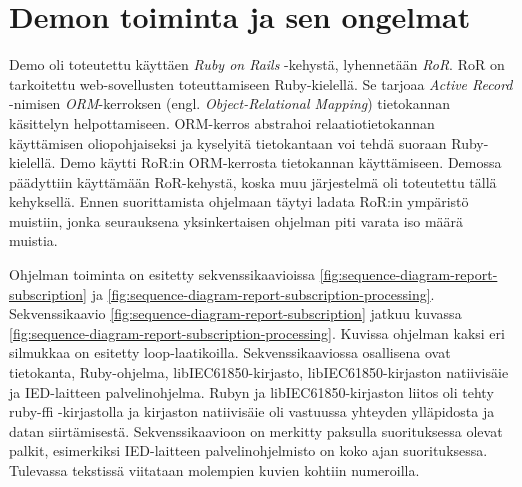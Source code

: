 \section{Demon toiminta ja sen ongelmat}
\label{ch:ongelmakohdat-ja-analysointi}
Demo oli toteutettu käyttäen \emph{Ruby on Rails} -kehystä, lyhennetään \emph{RoR}. RoR on tarkoitettu web-sovellusten toteuttamiseen Ruby-kielellä. Se tarjoaa \emph{Active Record} -nimisen \emph{ORM}-kerroksen (engl. \emph{Object-Relational Mapping}) tietokannan käsittelyn helpottamiseen. ORM-kerros abstrahoi relaatiotietokannan käyttämisen oliopohjaiseksi ja kyselyitä tietokantaan voi tehdä suoraan Ruby-kielellä. Demo käytti RoR:in ORM-kerrosta tietokannan käyttämiseen. Demossa päädyttiin käyttämään RoR-kehystä, koska muu järjestelmä oli toteutettu tällä kehyksellä. Ennen suorittamista ohjelmaan täytyi ladata RoR:in ympäristö muistiin, jonka seurauksena yksinkertaisen ohjelman piti varata iso määrä muistia.

Ohjelman toiminta on esitetty sekvenssikaavioissa \ref{fig:sequence-diagram-report-subscription} ja \ref{fig:sequence-diagram-report-subscription-processing}. Sekvenssikaavio \ref{fig:sequence-diagram-report-subscription} jatkuu kuvassa \ref{fig:sequence-diagram-report-subscription-processing}. Kuvissa ohjelman kaksi eri silmukkaa on esitetty loop-laatikoilla. Sekvenssikaaviossa osallisena ovat tietokanta, Ruby-ohjelma, libIEC61850-kirjasto, libIEC61850-kirjaston natiivisäie ja IED-laitteen palvelinohjelma. Rubyn ja libIEC61850-kirjaston liitos oli tehty ruby-ffi -kirjastolla ja kirjaston natiivisäie oli vastuussa yhteyden ylläpidosta ja datan siirtämisestä. Sekvenssikaavioon on merkitty paksulla suorituksessa olevat palkit, esimerkiksi IED-laitteen palvelinohjelmisto on koko ajan suorituksessa. Tulevassa tekstissä viitataan molempien kuvien kohtiin numeroilla.

